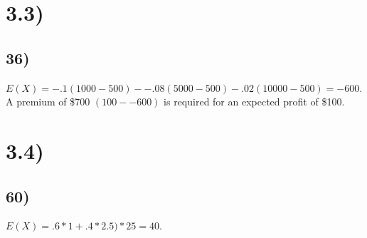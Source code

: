 \documentclass{article}
\begin{document}
\section*{3.3)}
	\subsection*{36)}
		$E(X) = -.1(1000-500) - -.08(5000-500) - .02(10000-500) = -600.$ A premium of \$700 $(100--600)$ is required for an expected profit of \$100. 
\section*{3.4)}
	\subsection*{60)}
		$E(X) = .6*1 + .4*2.5)*25 = 40$. 
			
		
				
\end{document}
